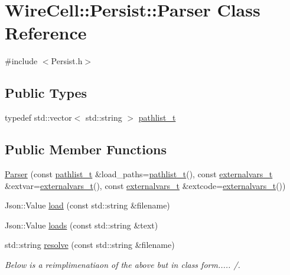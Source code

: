 \hypertarget{class_wire_cell_1_1_persist_1_1_parser}{}\section{Wire\+Cell\+:\+:Persist\+:\+:Parser Class Reference}
\label{class_wire_cell_1_1_persist_1_1_parser}


{\ttfamily \#include $<$Persist.\+h$>$}

\subsection*{Public Types}
\begin{DoxyCompactItemize}
\item 
typedef std\+::vector$<$ std\+::string $>$ \hyperlink{class_wire_cell_1_1_persist_1_1_parser_afb9688b844e6ea04e935a760d2de5c7a}{pathlist\+\_\+t}
\end{DoxyCompactItemize}
\subsection*{Public Member Functions}
\begin{DoxyCompactItemize}
\item 
\hyperlink{class_wire_cell_1_1_persist_1_1_parser_ad3cf367f83af613e9f9cd66134314899}{Parser} (const \hyperlink{class_wire_cell_1_1_persist_1_1_parser_afb9688b844e6ea04e935a760d2de5c7a}{pathlist\+\_\+t} \&load\+\_\+paths=\hyperlink{class_wire_cell_1_1_persist_1_1_parser_afb9688b844e6ea04e935a760d2de5c7a}{pathlist\+\_\+t}(), const \hyperlink{namespace_wire_cell_1_1_persist_ae031fc57de5b5814ccd700d007bc847b}{externalvars\+\_\+t} \&extvar=\hyperlink{namespace_wire_cell_1_1_persist_ae031fc57de5b5814ccd700d007bc847b}{externalvars\+\_\+t}(), const \hyperlink{namespace_wire_cell_1_1_persist_ae031fc57de5b5814ccd700d007bc847b}{externalvars\+\_\+t} \&extcode=\hyperlink{namespace_wire_cell_1_1_persist_ae031fc57de5b5814ccd700d007bc847b}{externalvars\+\_\+t}())
\item 
Json\+::\+Value \hyperlink{class_wire_cell_1_1_persist_1_1_parser_ac33db035695f8fa0e800f2eb6c922ef0}{load} (const std\+::string \&filename)
\item 
Json\+::\+Value \hyperlink{class_wire_cell_1_1_persist_1_1_parser_a3438a15f2e7c437d5c931348f1f1a29f}{loads} (const std\+::string \&text)
\item 
std\+::string \hyperlink{class_wire_cell_1_1_persist_1_1_parser_ac4af87e2df81644df5e76f498831dba6}{resolve} (const std\+::string \&filename)
\begin{DoxyCompactList}\small\item\em Below is a reimplimenatiaon of the above but in class form..... /. \end{DoxyCompactList}\end{DoxyCompactItemize}



